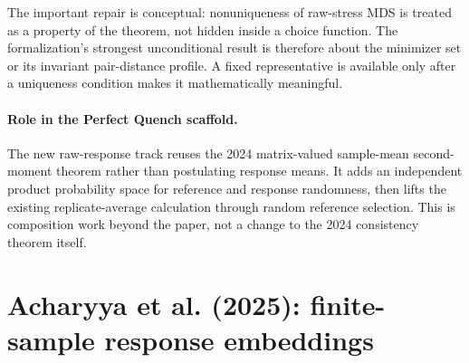 \documentclass[11pt]{article}
\begin{document}
The important repair is conceptual: nonuniqueness of raw-stress MDS is treated
as a property of the theorem, not hidden inside a choice function.  The
formalization's strongest unconditional result is therefore about the minimizer
set or its invariant pair-distance profile.  A fixed representative is available
only after a uniqueness condition makes it mathematically meaningful.


\paragraph{Role in the Perfect Quench scaffold.}
The new raw-response track reuses the 2024 matrix-valued sample-mean
second-moment theorem rather than postulating response means.  It adds an
independent product probability space for reference and response randomness,
then lifts the existing replicate-average calculation through random reference
selection.  This is composition work beyond the paper, not a change to the
2024 consistency theorem itself.

\section{Acharyya et al. (2025): finite-sample response embeddings}
\end{document}
